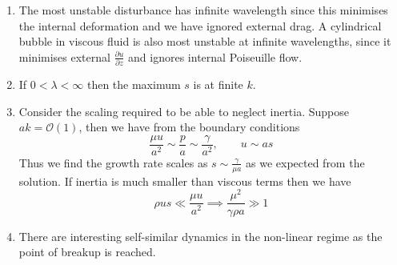 \documentclass{jknotes}
\begin{document}
\begin{center}
\end{center}

\begin{enumerate}
	\item The most unstable disturbance has infinite wavelength since this
		minimises the internal deformation and we have ignored external drag.
		A cylindrical bubble in viscous fluid is also most unstable at
		infinite wavelengths, since it minimises external $\frac{\partial
		u}{\partial z}$ and ignores internal Poiseuille flow.
	\item If $0 < \lambda < \infty$ then the maximum $s$ is at finite $k$.
	\begin{center}
		\end{center}
	\item Consider the scaling required to be able to neglect inertia. Suppose
		$ak = \mathcal{O}(1)$, then we have from the boundary conditions
		\begin{equation}
			\frac{\mu u}{a^2} \sim \frac{p}{a} \sim \frac{\gamma}{a^2},
			\hspace{2em} u \sim as 
		\end{equation}
		Thus we find the growth rate scales as $s \sim \frac{\gamma}{\mu a}$
		as we expected from the solution. If inertia is much smaller than
		viscous terms then we have
		\begin{equation}
			\rho u s \ll \frac{\mu u}{a^2} \implies \frac{\mu ^2}{\gamma \rho
			a} \gg 1
		\end{equation}
	\item There are interesting self-similar dynamics in the non-linear regime
		as the point of breakup is reached.
\end{enumerate}
\end{document}
